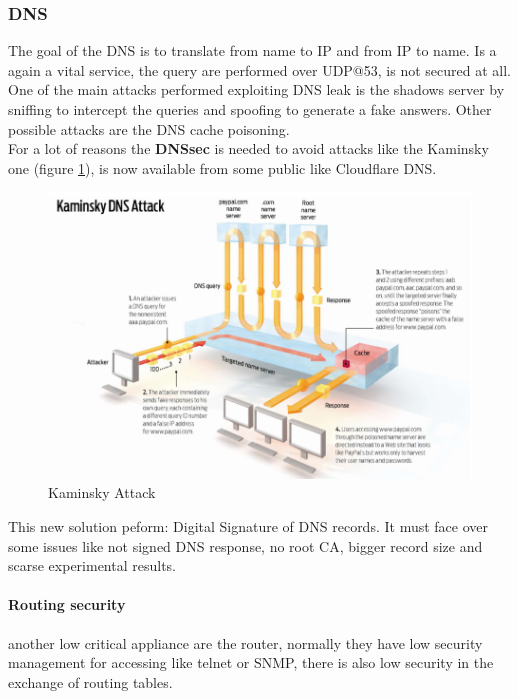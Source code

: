 \documentclass[12pt]{article}
\begin{document}
\subsubsection{DNS}
The goal of the DNS is to translate from name to IP and from IP to name. Is a again a vital service, the query are performed over UDP@53, is not secured at all.\\
One of the main attacks performed exploiting DNS leak is the shadows server by sniffing to intercept the queries and spoofing to generate a fake answers. Other possible attacks are the DNS cache poisoning.\\
For a lot of reasons the \textbf{DNSsec} is needed to avoid attacks like the Kaminsky one (figure \ref{fig:kaminsky}), is now available from some public like Cloudflare DNS.
\begin{figure}[H]
   \centering
   \includegraphics[width=\linewidth]{images/kaminsky.png}
   \caption{Kaminsky Attack}
   \label{fig:kaminsky}
\end{figure}
This new solution peform: Digital Signature of DNS records. It must face over some issues like not signed DNS response, no root CA, bigger record size and scarse experimental results.

\paragraph{Routing security} another low critical appliance are the router, normally they have low security management for accessing like telnet or SNMP, there is also low security in the exchange of routing tables.
\end{document}
